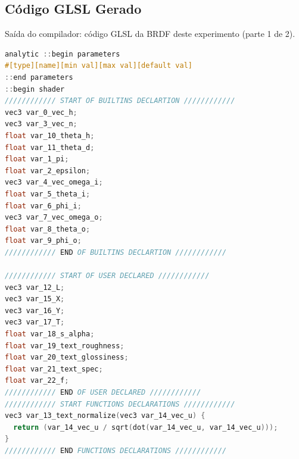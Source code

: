 \subsection{Código GLSL Gerado}
\begin{codigo}[H]
    \caption{\small Saída do compilador: código GLSL da BRDF deste experimento (parte 1 de 2).}
    \label{cod-kajiya-glsl-pt-1}
\begin{lstlisting}[language=C, inputencoding=utf8]
analytic ::begin parameters
#[type][name][min val][max val][default val]
::end parameters
::begin shader
//////////// START OF BUILTINS DECLARTION ////////////
vec3 var_0_vec_h;
vec3 var_3_vec_n;
float var_10_theta_h;
float var_11_theta_d;
float var_1_pi;
float var_2_epsilon;
vec3 var_4_vec_omega_i;
float var_5_theta_i;
float var_6_phi_i;
vec3 var_7_vec_omega_o;
float var_8_theta_o;
float var_9_phi_o;
//////////// END OF BUILTINS DECLARTION ////////////

//////////// START OF USER DECLARED ////////////
vec3 var_12_L;
vec3 var_15_X;
vec3 var_16_Y;
vec3 var_17_T;
float var_18_s_alpha;
float var_19_text_roughness;
float var_20_text_glossiness;
float var_21_text_spec;
float var_22_f;
//////////// END OF USER DECLARED ////////////
//////////// START FUNCTIONS DECLARATIONS ////////////
vec3 var_13_text_normalize(vec3 var_14_vec_u) {
  return (var_14_vec_u / sqrt(dot(var_14_vec_u, var_14_vec_u)));
}
//////////// END FUNCTIONS DECLARATIONS ////////////
\end{lstlisting}
\end{codigo}

